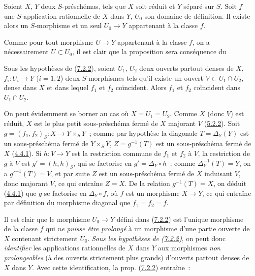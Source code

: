 \begin{proposition}[7.2.2]
\label{I.7.2.2-fr}
Soient $X$, $Y$ deux $S$-préschémas, tels que $X$ soit réduit et $Y$ séparé
sur $S$. Soit $f$ une $S$-application rationnelle de $X$ dans $Y$, $U_0$ son
domaine de définition. Il existe alors un $S$-morphisme et un seul $U_0\to Y$
appartenant à la classe $f$.
\end{proposition}

Comme pour tout morphisme $U\to Y$ appartenant à la classe $f$, on a
nécessairement $U\subset U_0$, il est clair que la proposition sera
conséquence du

\begin{lemma}[7.2.2.1]
\label{I.7.2.2.1-fr}
Sous les hypothèses de (\hyperref[I.7.2.2-fr]{7.2.2}), soient $U_1$, $U_2$
deux ouverts partout denses de $X$, $f_i:U_i\to Y$ ($i=1,2$) deux
$S$-morphismes tels qu'il existe un ouvert $V\subset U_1\cap U_2$, dense dans
$X$ et dans lequel $f_1$ et $f_2$ coïncident. Alors $f_1$ et $f_2$ coïncident
dans $U_1\cap U_2$.
\end{lemma}

On peut évidemment se borner au cas où $X=U_1=U_2$. Comme $X$ (donc $V$)
est réduit, $X$ est le plus petit sous-préschéma fermé de $X$ majorant $V$
(\hyperref[I.5.2.2-fr]{5.2.2}). Soit
$g=(f_1,f_2)_S:X\to Y\times_S Y$~; comme par hypothèse la diagonale
$T=\Delta_Y(Y)$ est un sous-préschéma fermé de $Y\times_S Y$,
$Z=g^{-1}(T)$ est un sous-préschéma fermé de $X$
(\hyperref[I.4.4.1-fr]{4.4.1}). Si $h:V\to Y$ est la restriction commune de
$f_1$ et $f_2$ à $V$, la restriction de $g$ à $V$ est $g'=(h,h)_S$, qui se
factorise en $g'=\Delta_Y\circ h$~; comme $\Delta_Y^{-1}(T)=Y$, on a
$g'^{-1}(T)=V$, et par suite $Z$ est un sous-préschéma fermé de $X$ induisant
$V$, donc majorant $V$, ce qui entraîne $Z=X$. De la relation
$g^{-1}(T)=X$, on déduit (\hyperref[I.4.4.1-fr]{4.4.1}) que $g$ se factorise
en $\Delta_Y\circ f$, où $f$ est un morphisme $X\to Y$, ce qui entraîne par
définition du morphisme diagonal que $f_1=f_2=f$.

Il est clair que le morphisme $U_0\to Y$ défini dans
(\hyperref[I.7.2.2-fr]{7.2.2}) est l'unique morphisme de la classe $f$ qui
\emph{ne puisse être prolongé} à un morphisme d'une partie ouverte de $X$
contenant strictement $U_0$. \emph{Sous les hypothèses de
(\hyperref[I.7.2.2-fr]{7.2.2})}, on peut donc \emph{identifier} les
applications rationnelles de $X$ dans $Y$ aux morphismes \emph{non
prolongeables} (à des ouverts strictement plus grands) d'ouverts partout
denses de $X$ dans $Y$. Avec cette identification, la prop.
(\hyperref[I.7.2.2-fr]{7.2.2}) entraîne~:

